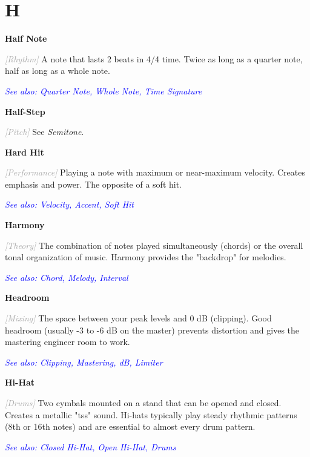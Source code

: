 \documentclass[11pt,letterpaper]{article}
\newcommand{\term}[1]{\textbf{\large\color{purple}#1}}
\newcommand{\category}[1]{\textcolor{darkgray}{\textit{\small [#1]}}}
\newcommand{\seealso}[1]{\textcolor{blue}{\textit{See also: #1}}}
\newenvironment{termdef}[1]
  {\noindent\term{#1}\par\nopagebreak}
  {\par\vspace{0.3em}}
\begin{document}
\newpage


\section*{H}

\begin{termdef}{Half Note}
\category{Rhythm}
A note that lasts 2 beats in 4/4 time. Twice as long as a quarter note, half as long as a whole note.

\seealso{Quarter Note, Whole Note, Time Signature}
\end{termdef}

\begin{termdef}{Half-Step}
\category{Pitch}
See \textit{Semitone}.
\end{termdef}

\begin{termdef}{Hard Hit}
\category{Performance}
Playing a note with maximum or near-maximum velocity. Creates emphasis and power. The opposite of a soft hit.

\seealso{Velocity, Accent, Soft Hit}
\end{termdef}

\begin{termdef}{Harmony}
\category{Theory}
The combination of notes played simultaneously (chords) or the overall tonal organization of music. Harmony provides the "backdrop" for melodies.

\seealso{Chord, Melody, Interval}
\end{termdef}

\begin{termdef}{Headroom}
\category{Mixing}
The space between your peak levels and 0 dB (clipping). Good headroom (usually -3 to -6 dB on the master) prevents distortion and gives the mastering engineer room to work.

\seealso{Clipping, Mastering, dB, Limiter}
\end{termdef}

\begin{termdef}{Hi-Hat}
\category{Drums}
Two cymbals mounted on a stand that can be opened and closed. Creates a metallic "tss" sound. Hi-hats typically play steady rhythmic patterns (8th or 16th notes) and are essential to almost every drum pattern.

\seealso{Closed Hi-Hat, Open Hi-Hat, Drums}
\end{termdef}
\end{document}
